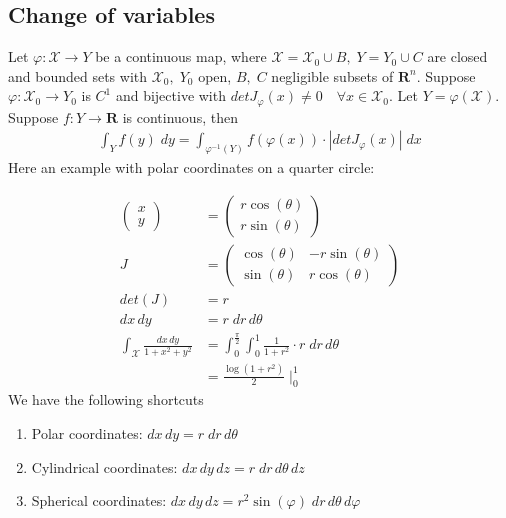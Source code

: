 \documentclass[8pt]{extarticle}
\newcommand{\R}{{\mathbb R}}
\newcommand{\X}{{\mathcal X}}
\newcommand{\ra}{{\rightarrow}}
\def\R{\mathbf{R}}
\begin{document}
\begin{multicols*}{3}
  \subsection{Change of variables}
  Let $\varphi: \X \ra Y$ be a continuous map, where
  $\X = \X_0 \cup B, \; Y = Y_0 \cup C$ are closed and bounded
  sets with $\X_0,\; Y_0$ open, $B, \; C$ negligible subsets of $\R^n$.
  Suppose $\varphi: \X_0 \ra Y_0$ is $C^1$ and bijective with
  $det J_\varphi(x) \neq 0 \quad \forall x \in \X_0$. Let $Y = \varphi(\X)$.
  Suppose $f: Y \ra \R$ is continuous, then
  \begin{align*}
    \int_Y f(y) \; dy = \int_{\varphi^{-1}(Y)} f(\varphi(x)) \cdot |det J_\varphi(x) | \; dx
  \end{align*}
  Here an example with polar coordinates on a quarter circle:
\begin{tcolorbox}[colback=blue!5!white,colframe=blue!75!black]
  \begin{align*}
    \begin{pmatrix}
      x \\
      y
    \end{pmatrix}
                                           & =
    \begin{pmatrix}
      r \cos(\theta) \\
      r \sin(\theta)
    \end{pmatrix}                                                                                            \\
    J                                      & =
    \begin{pmatrix}
      \cos(\theta) & -r \sin(\theta) \\
      \sin(\theta) & r \cos(\theta)
    \end{pmatrix}                                                                                            \\
    det(J)                                 & = r                                                                          \\
    dx \, dy                               & = r \; dr \, d\theta                                                         \\
    \int_\X \frac{dx \, dy}{1 + x^2 + y^2} & = \int_0^{\frac{\pi}{2}} \int_0^1 \frac{1}{1 + r^2} \cdot r \; dr \, d\theta \\
                                           & = \frac{\log(1 + r^2)}{2} \; \Big |_0^1
  \end{align*}
  We have the following shortcuts
  \begin{enumerate}[label=(\arabic*)]
    \item Polar coordinates: $dx\, dy = r \; dr \, d\theta$
    \item Cylindrical coordinates: $dx \, dy \, dz = r \; dr \, d\theta \, dz$
    \item Spherical coordinates: $dx \, dy \, dz = r^2 \sin(\varphi) \; dr \, d\theta \, d\varphi$
  \end{enumerate}
\end{tcolorbox}

\end{multicols*}
\end{document}
